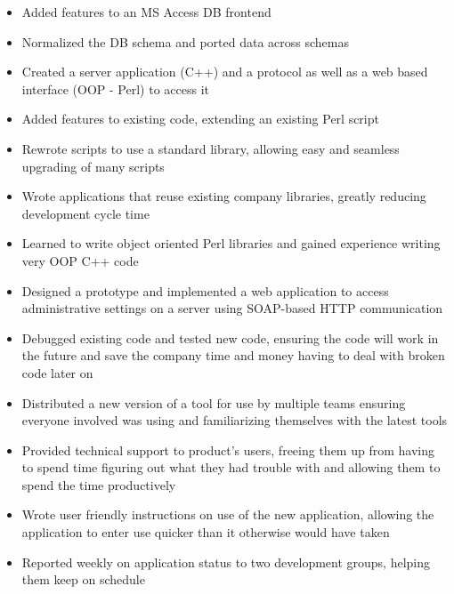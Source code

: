 \documentclass{article}
\begin{document}
      \begin{itemize}
        \item Added features to an MS Access DB frontend
        \item Normalized the DB schema and ported data across schemas
      \end{itemize}

      \begin{itemize}
        \item Created a server application (C++) and a protocol as well as a web based interface (OOP - Perl) to access it
        \item Added features to existing code, extending an existing Perl script 
        \item Rewrote scripts to use a standard library, allowing easy and seamless upgrading of many scripts
        \item Wrote applications that reuse existing company libraries, greatly reducing development cycle time
        \item Learned to write object oriented Perl libraries and gained experience writing very OOP C++ code
      \end{itemize}

      \begin{itemize}
        \item Designed a prototype and implemented a web application to access administrative settings on a server using SOAP-based HTTP communication
        \item Debugged existing code and tested new code, ensuring the code will work in the future and save the company time and money having to deal with broken code later on
        \item Distributed a new version of a tool for use by multiple teams ensuring everyone involved was using and familiarizing themselves with the latest tools
        \item Provided technical support to product’s users, freeing them up from having to spend time figuring out what they had trouble with and allowing them to spend the time productively
        \item Wrote user friendly instructions on use of the new application, allowing the application to enter use quicker than it otherwise would have taken 
        \item Reported weekly on application status to two development groups, helping them keep on schedule
      \end{itemize}
\end{document}

